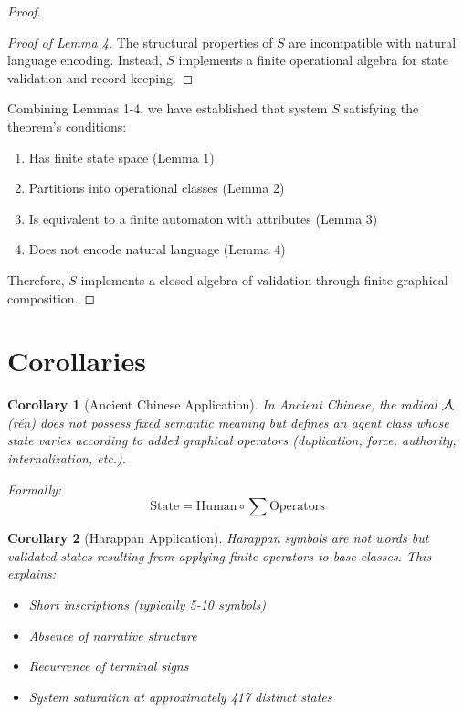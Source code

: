 \documentclass[12pt,a4paper]{article}
\newtheorem{corollary}{Corollary}[theorem]
\begin{document}
\begin{proof}
\begin{proof}[Proof of Lemma 4]
The structural properties of $S$ are incompatible with natural language encoding. Instead, $S$ implements a finite operational algebra for state validation and record-keeping.
\end{proof}

Combining Lemmas 1-4, we have established that system $S$ satisfying the theorem's conditions:
\begin{enumerate}
    \item Has finite state space (Lemma 1)
    \item Partitions into operational classes (Lemma 2)
    \item Is equivalent to a finite automaton with attributes (Lemma 3)
    \item Does not encode natural language (Lemma 4)
\end{enumerate}

Therefore, $S$ implements a closed algebra of validation through finite graphical composition.
\end{proof}

\section{Corollaries}

\begin{corollary}[Ancient Chinese Application]
In Ancient Chinese, the radical 人 (rén) does not possess fixed semantic meaning but defines an agent class whose state varies according to added graphical operators (duplication, force, authority, internalization, etc.).

Formally:
\[
\text{State} = \text{Human} \circ \sum \text{Operators}
\]
\end{corollary}

\begin{corollary}[Harappan Application]
Harappan symbols are not words but validated states resulting from applying finite operators to base classes. This explains:
\begin{itemize}
    \item Short inscriptions (typically 5-10 symbols)
    \item Absence of narrative structure
    \item Recurrence of terminal signs
    \item System saturation at approximately 417 distinct states
\end{itemize}
\end{corollary}
\end{document}
